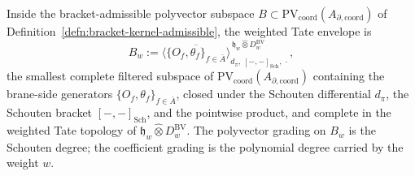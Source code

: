 \begin{defn}\label{defn:wt-Bw-envelope}
  Inside the bracket-admissible polyvector subspace
  $B\subset\mathrm{PV}_{\mathrm{coord}}(A_{\partial,\mathrm{coord}})$ of
  Definition~\ref{defn:bracket-kernel-admissible}, the weighted Tate
  envelope is
  \[
    B_w
      :=\overline{\bigl\langle
          \{O_f,\theta_f\}_{f\in\bar A}
        \bigr\rangle}_{d_\pi,\,[-,-]_{\mathrm{Sch}},\,\cdot}
      ^{\,\mathfrak h_w\widehat\otimes
        D^{\mathrm{BV}}_w},
  \]
  the smallest complete filtered subspace of
  $\mathrm{PV}_{\mathrm{coord}}(A_{\partial,\mathrm{coord}})$ containing
  the brane-side generators
  $\{O_f,\theta_f\}_{f\in\bar A}$, closed under the Schouten
  differential $d_\pi$, the Schouten bracket $[-,-]_{\mathrm{Sch}}$, and
  the pointwise product, and complete in the weighted Tate topology of
  $\mathfrak h_w\widehat\otimes D^{\mathrm{BV}}_w$.
  The polyvector grading on $B_w$ is the Schouten degree; the
  coefficient grading is the polynomial degree carried by the weight $w$.
\end{defn}

